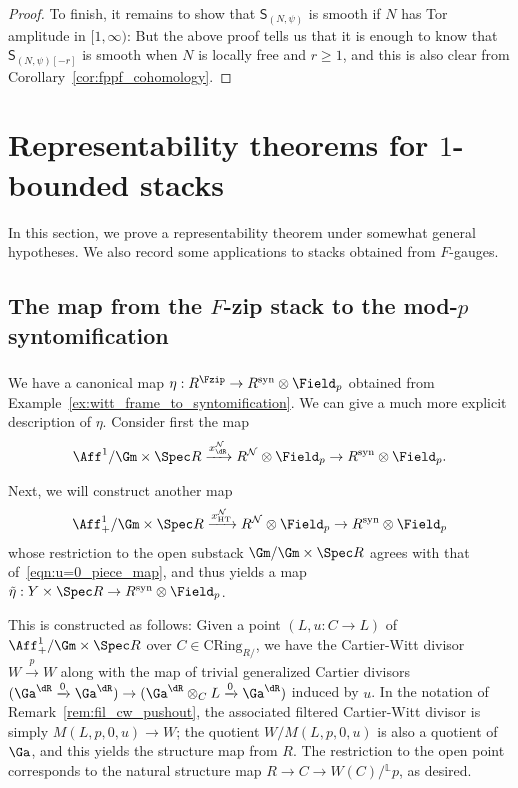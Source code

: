 \documentclass[10pt]{amsart}
\begin{document}
\begin{proof}
To finish, it remains to show that $\mathsf{S}_{(N,\psi)}$ is smooth if $N$ has Tor amplitude in $[1,\infty)$: But the above proof tells us that it is enough to know that $\mathsf{S}_{(N,\psi)[-r]}$ is smooth when $N$ is locally free and $r\ge 1$, and this is also clear from Corollary~\ref{cor:fppf_cohomology}.
\end{proof}

\section{Representability theorems for $1$-bounded stacks}
\label{sec:abstract}

In this section, we prove a representability theorem under somewhat general hypotheses. We also record some applications to stacks obtained from $F$-gauges. 



\subsection{The map from the $F$-zip stack to the mod-$p$ syntomification}
\label{subsec:fzip_to_syn}


\subsubsection{}
We have a canonical map $\eta:R^{\Fzip}\to R^{\mathrm{syn}}\otimes\Field_p$ obtained from Example~\ref{ex:witt_frame_to_syntomification}. We can give a much more explicit description of $\eta$. Consider first the map
\begin{align}\label{eqn:u=0_piece_map}
\Aff^1/\Gm\times \Spec R\xrightarrow{x^{\mathcal{N}}_{\dR}}R^{\mathcal{N}}\otimes\Field_p\to R^{\mathrm{syn}}\otimes\Field_p.
\end{align}

Next, we will construct another map
\begin{align}\label{eqn:t=0_piece_map}
\Aff^1_+/\Gm\times \Spec R\xrightarrow{x^{\mathcal{N}}_{\mathrm{HT}}} R^{\mathcal{N}}\otimes\Field_p\to R^{\mathrm{syn}}\otimes\Field_p
\end{align}
whose restriction to the open substack $\Gm/\Gm\times \Spec R$ agrees with that of~\eqref{eqn:u=0_piece_map}, and thus yields a map $\tilde{\eta}:Y\times \Spec R\to R^{\mathrm{syn}}\otimes\Field_p$.

This is constructed as follows: Given a point $(L,u:C\to L)$ of $\Aff^1_+/\Gm\times \Spec R$ over $C\in \mathrm{CRing}_{R/}$, we have the Cartier-Witt divisor $W\xrightarrow{p}W$ along with the map of trivial generalized Cartier divisors $(\Ga^{\dR}\xrightarrow{0}\Ga^{\dR})\to (\Ga^{\dR}\otimes_CL\xrightarrow{0}\Ga^{\dR})$ induced by $u$. In the notation of Remark~\ref{rem:fil_cw_pushout}, the associated filtered Cartier-Witt divisor is simply $M(L,p,0,u)\to W$; the quotient $W/M(L,p,0,u)$ is also a quotient of $\Ga$, and this yields the structure map from $R$. The restriction to the open point corresponds to the natural structure map $R\to C\to W(C)/{}^{\mathbb{L}}p$, as desired.
\end{document}
